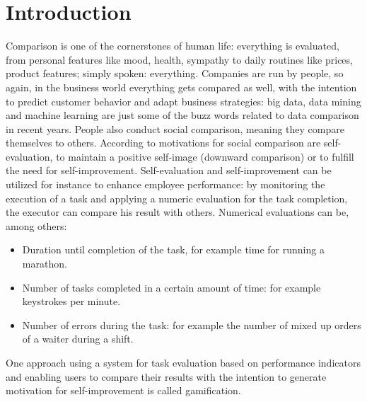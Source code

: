 \glsunsetall

\tableofcontents
\setcounter{page}{2}
\listoffigures
{\let\clearpage\relax \listoftables}

\glsresetall

\printnoidxglossary[type=\acronymtype,title={List of Acronyms}]

{\let\clearpage\relax \printnoidxglossary[type=symbols,sort=letter]}


\chapter{Introduction} \label{Introduction}


Comparison is one of the cornerstones of human life: everything is evaluated, from personal features like mood, health, sympathy to daily routines like prices, product features; simply spoken: everything. Companies are run by people, so again, in the business world everything gets compared as well, with the intention to predict customer behavior and adapt business strategies: big data, data mining and machine learning are just some of the buzz words related to data comparison in recent years.
People also conduct social comparison, meaning they compare themselves to others. According to \textcite{Corcoran2011} motivations for social comparison are self-evaluation, to maintain a positive self-image (downward comparison) or to fulfill the need for self-improvement.
Self-evaluation and self-improvement can be utilized for instance to enhance employee performance: by monitoring the execution of a task and applying a numeric evaluation for the task completion, the executor can compare his result with others.
Numerical evaluations can be, among others:
\begin{itemize}
	\item Duration until completion of the task, for example time for running a marathon.
	\item Number of tasks completed in a certain amount of time: for example keystrokes per minute.
	\item Number of errors during the task: for example the number of mixed up orders of a waiter during a shift.
\end{itemize}
One approach using a system for task evaluation based on performance indicators and enabling users to compare their results with the intention to generate motivation for self-improvement is called gamification. 


